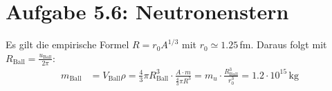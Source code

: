 \documentclass[a4paper,12pt]{article}
\newcommand{\tecxt}{}
\begin{document}
\section*{Aufgabe 5.6: Neutronenstern}
Es gilt die empirische Formel $R=r_0A^{1/3}$ mit $r_0\simeq 1.25\,$fm. Daraus folgt mit $R_\tecxt\text{Ball}=\frac{u_\tecxt\text{Ball}}{2\pi}$:
\begin{align*}
m_\tecxt\text{Ball}&=V_\tecxt\text{Ball}\rho=\frac{4}{3}\pi R_\tecxt\text{Ball}^3\cdot\frac{A\cdot m}{\frac{4}{3}\pi R^3}=m_u\cdot\frac{R_\tecxt\text{Ball}^3}{r_0^3}=1.2\cdot 10^{15}\,\tecxt\text{kg}
\end{align*}
\end{document}
